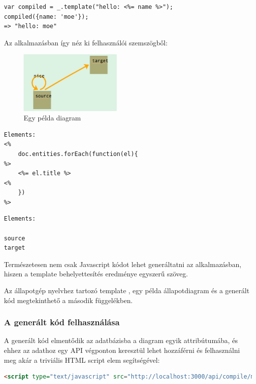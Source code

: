 \begin{lstlisting}[caption=Underscore template lefordítása]
var compiled = _.template("hello: <%= name %>");
compiled({name: 'moe'});
=> "hello: moe"
\end{lstlisting}

Az alkalmazásban így néz ki felhasználói szemszögből:

\begin{figure}[!ht]
\centering
\includegraphics[width=5cm,keepaspectratio]{figures/simple-graph.png}
\caption{Egy példa diagram}
\label{fig:compileseq}
\end{figure}

\begin{lstlisting}[caption=A gráftranszformációs Underscore template]
Elements: 
<% 
    doc.entities.forEach(function(el){
%>
    <%= el.title %>
<%
    })
%>
\end{lstlisting}


\begin{lstlisting}[language=HTML,caption=Az eredmény]
Elements: 

source
target
\end{lstlisting}

Természetesen nem csak Javascript kódot lehet generáltatni az alkalmazásban, hiszen a template behelyettesítés eredménye egyszerű szöveg. 

Az állapotgép nyelvhez tartozó template , egy példa állapotdiagram és a generált kód megtekinthető a második függelékben.




\subsubsection{A generált kód felhasználása}

A generált kód elmentődik az adatbázisba a diagram egyik attribútumába, és ehhez az adathoz egy API végponton keresztül lehet hozzáférni és felhasználni meg akár a triviális HTML script elem segítségével:

\begin{lstlisting}[language=HTML]
 <script type="text/javascript" src="http://localhost:3000/api/compile/modules/5242aa48ddda9b0000000001/"></script>
\end{lstlisting}

